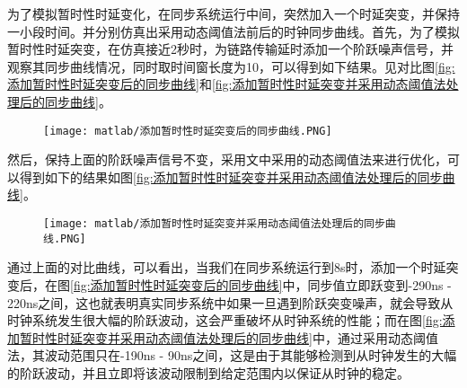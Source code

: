 为了模拟暂时性时延变化，在同步系统运行中间，突然加入一个时延突变，并保持一小段时间。并分别仿真出采用动态阈值法前后的时钟同步曲线。首先，为了模拟暂时性时延突变，在仿真接近2秒时，为链路传输延时添加一个阶跃噪声信号，并观察其同步曲线情况，同时取时间窗长度为10，可以得到如下结果。见对比图\ref{fig:添加暂时性时延突变后的同步曲线}和\ref{fig:添加暂时性时延突变并采用动态阈值法处理后的同步曲线}。
\begin{figure}[htbp]
  \centering
  \begin{minipage}[b]{1\textwidth}
    \captionstyle{\centering}
    \centering
    \texttt{[image: matlab/添加暂时性时延突变后的同步曲线.PNG]}
  \end{minipage}     
\end{figure}

然后，保持上面的阶跃噪声信号不变，采用文中采用的动态阈值法来进行优化，可以得到如下的结果如图\ref{fig:添加暂时性时延突变并采用动态阈值法处理后的同步曲线}。
\begin{figure}[htbp]
  \centering
  \begin{minipage}[b]{1\textwidth}
    \captionstyle{\centering}
    \centering
    \texttt{[image: matlab/添加暂时性时延突变并采用动态阈值法处理后的同步曲线.PNG]}
  \end{minipage}     
\end{figure}

通过上面的对比曲线，可以看出，当我们在同步系统运行到8s时，添加一个时延突变后，在图\ref{fig:添加暂时性时延突变后的同步曲线}中，同步值立即跃变到-290ns - 220ns之间，这也就表明真实同步系统中如果一旦遇到阶跃突变噪声，就会导致从时钟系统发生很大幅的阶跃波动，这会严重破坏从时钟系统的性能；而在图\ref{fig:添加暂时性时延突变并采用动态阈值法处理后的同步曲线}中，通过采用动态阈值法，其波动范围只在-190ns - 90ns之间，这是由于其能够检测到从时钟发生的大幅的阶跃波动，并且立即将该波动限制到给定范围内以保证从时钟的稳定。

